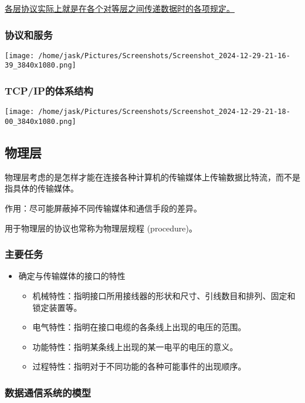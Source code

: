 \documentclass[11pt]{article}
\begin{document}
\uline{各层协议实际上就是在各个对等层之间传递数据时的各项规定。}
\subsubsection{协议和服务}
\label{sec:org0a5dd48}

\begin{center}
\texttt{[image: /home/jask/Pictures/Screenshots/Screenshot\_2024-12-29-21-16-39\_3840x1080.png]}
\end{center}
\subsubsection{TCP/IP的体系结构}
\label{sec:org21ab0be}

\begin{center}
\texttt{[image: /home/jask/Pictures/Screenshots/Screenshot\_2024-12-29-21-18-00\_3840x1080.png]}
\end{center}
\subsection{物理层}
\label{sec:org53e1b39}

物理层考虑的是怎样才能在连接各种计算机的传输媒体上传输数据比特流，而不是指具体的传输媒体。

作用：尽可能屏蔽掉不同传输媒体和通信手段的差异。

用于物理层的协议也常称为物理层规程 (procedure)。
\subsubsection{主要任务}
\label{sec:orga67a340}
\begin{itemize}
\item 确定与传输媒体的接口的特性
\begin{itemize}
\item 机械特性：指明接口所用接线器的形状和尺寸、引线数目和排列、固定和锁定装置等。
\item 电气特性：指明在接口电缆的各条线上出现的电压的范围。
\item 功能特性：指明某条线上出现的某一电平的电压的意义。
\item 过程特性：指明对于不同功能的各种可能事件的出现顺序。
\end{itemize}
\end{itemize}
\subsubsection{数据通信系统的模型}
\label{sec:orgc0c0699}
\end{document}
